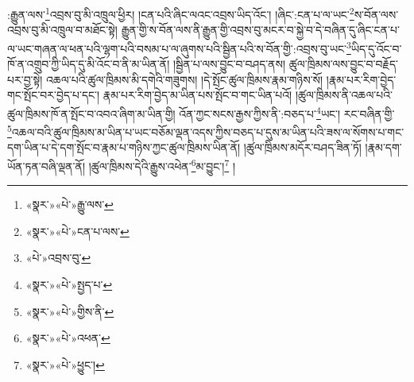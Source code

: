 :རྒྱུན་ལས་\footnote{«སྣར་»«པེ་»རྒྱུ་ལས་}འབྲས་བུ་མི་འཁྲུལ་ཕྱིར། །ངན་པའི་ཞིང་ལའང་འབྲས་ཡིད་འོང་། །ཞིང་:ངན་པ་ལ་ཡང་\footnote{«སྣར་»«པེ་»ངན་པ་ལས་}ས་བོན་ལས་འབྲས་བུ་མི་འཁྲུལ་བ་མཐོང་སྟེ། རྒྱུན་གྱི་ས་བོན་ལས་ནི་རྒྱུན་གྱི་འབྲས་བུ་མངར་བ་སྐྱེ་བ་དེ་བཞིན་དུ་ཞིང་ངན་པ་ལ་ཡང་གཞན་ལ་ཕན་པའི་ལྷག་པའི་བསམ་པ་ལ་ཞུགས་པའི་སྦྱིན་པའི་ས་བོན་གྱི་:འབྲས་བུ་ཡང་\footnote{«པེ་»འབྲས་བུ་}ཡིད་དུ་འོང་བ་ཁོ་ན་འགྲུབ་ཀྱི་ཡིད་དུ་མི་འོང་བ་ནི་མ་ཡིན་ནོ། །སྦྱིན་པ་ལས་བྱུང་བ་བཤད་ནས། ཚུལ་ཁྲིམས་ལས་བྱུང་བ་བརྗོད་པར་བྱ་སྟེ། འཆལ་པའི་ཚུལ་ཁྲིམས་མི་དགེའི་གཟུགས། །དེ་སྤོང་ཚུལ་ཁྲིམས་རྣམ་གཉིས་སོ། །རྣམ་པར་རིག་བྱེད་གང་སྤོང་བར་བྱེད་པ་དང་། རྣམ་པར་རིག་བྱེད་མ་ཡིན་པས་སྤོང་བ་གང་ཡིན་པའོ། །ཚུལ་ཁྲིམས་ནི་འཆལ་པའི་ཚུལ་ཁྲིམས་ཁོ་ན་སྤོང་བ་འབའ་ཞིག་མ་ཡིན་གྱི། འོན་ཀྱང་སངས་རྒྱས་ཀྱིས་ནི་:བཅད་པ་\footnote{«སྣར་»«པེ་»སྤྱད་པ་}ཡང་། རང་བཞིན་གྱི་\footnote{«སྣར་»«པེ་»གྱིས་ནི་}འཆལ་བའི་ཚུལ་ཁྲིམས་མ་ཡིན་པ་ཡང་བཅོམ་ལྡན་འདས་ཀྱིས་བཅད་པ་དུས་མ་ཡིན་པའི་ཟས་ལ་སོགས་པ་གང་དག་ཡིན་པ་དེ་དག་སྤོང་བ་རྣམ་པ་གཉིས་ཀྱང་ཚུལ་ཁྲིམས་ཡིན་ནོ། །ཚུལ་ཁྲིམས་མདོར་བཤད་ཟིན་ཏོ། །རྣམ་དག་ཡོན་ཏན་བཞི་ལྡན་ནོ། །ཚུལ་ཁྲིམས་དེའི་རྒྱུས་འཕེན་\footnote{«སྣར་»«པེ་»འཕན་}མ་བྱུང་།\footnote{«སྣར་»«པེ་»ཕྱུང་།} །
